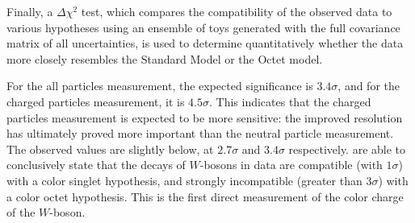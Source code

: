\FloatBarrier

Finally, a $\Delta \chi^2$ test, which compares the compatibility of the observed data to various hypotheses using an ensemble of toys generated with the full covariance matrix of all uncertainties, is used to determine quantitatively whether the data more closely resembles the Standard Model or the Octet model. 

For the all particles measurement, the expected significance is $3.4\sigma$, and for the charged particles measurement, it is $4.5\sigma$. This indicates that the charged particles measurement is expected to be more sensitive: the improved resolution has ultimately proved more important than the neutral particle measurement. The observed values are slightly below, at $2.7\sigma$ and $3.4\sigma$ respectively. are able to conclusively state that the decays of $W$-bosons in data are compatible (with $1\sigma$) with a color singlet hypothesis, and strongly incompatible (greater than $3\sigma$) with a color octet hypothesis. This is the first direct measurement of the color charge of the $W$-boson.




